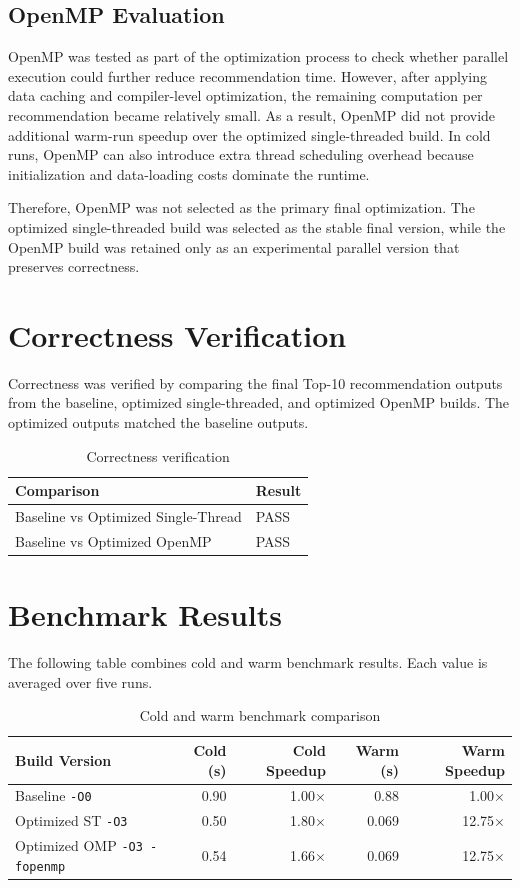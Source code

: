 \documentclass[11pt]{article}
\begin{document}
\subsection{OpenMP Evaluation}

OpenMP was tested as part of the optimization process to check whether parallel execution could further reduce recommendation time. However, after applying data caching and compiler-level optimization, the remaining computation per recommendation became relatively small. As a result, OpenMP did not provide additional warm-run speedup over the optimized single-threaded build. In cold runs, OpenMP can also introduce extra thread scheduling overhead because initialization and data-loading costs dominate the runtime.

Therefore, OpenMP was not selected as the primary final optimization. The optimized single-threaded build was selected as the stable final version, while the OpenMP build was retained only as an experimental parallel version that preserves correctness.

\section{Correctness Verification}

Correctness was verified by comparing the final Top-10 recommendation outputs from the baseline, optimized single-threaded, and optimized OpenMP builds. The optimized outputs matched the baseline outputs.

\begin{table}[H]
\centering
\caption{Correctness verification}
\begin{tabular}{ll}
\toprule
\textbf{Comparison} & \textbf{Result} \\
\midrule
Baseline vs Optimized Single-Thread & PASS \\
Baseline vs Optimized OpenMP & PASS \\
\bottomrule
\end{tabular}
\end{table}

\section{Benchmark Results}

The following table combines cold and warm benchmark results. Each value is averaged over five runs.

\begin{table}[H]
\centering
\caption{Cold and warm benchmark comparison}
\begin{tabular}{lrrrr}
\toprule
\textbf{Build Version} & \textbf{Cold (s)} & \textbf{Cold Speedup} & \textbf{Warm (s)} & \textbf{Warm Speedup} \\
\midrule
Baseline \texttt{-O0} & 0.90 & 1.00$\times$ & 0.88 & 1.00$\times$ \\
Optimized ST \texttt{-O3} & 0.50 & 1.80$\times$ & 0.069 & 12.75$\times$ \\
Optimized OMP \texttt{-O3 -fopenmp} & 0.54 & 1.66$\times$ & 0.069 & 12.75$\times$ \\
\bottomrule
\end{tabular}
\end{table}
\end{document}
